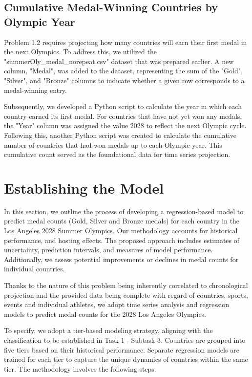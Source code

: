 \documentclass{mcmthesis}
\begin{document}
\subsection{Cumulative Medal-Winning Countries by Olympic Year}
Problem 1.2 requires projecting how many countries will earn their first medal in the next Olympics. To address this, we utilized the "summerOly\_medal\_norepeat.csv" dataset that was prepared earlier. A new column, "Medal", was added to the dataset, representing the sum of the "Gold", "Silver", and "Bronze" columns to indicate whether a given row corresponds to a medal-winning entry.

Subsequently, we developed a Python script to calculate the year in which each country earned its first medal. For countries that have not yet won any medals, the "Year" column was assigned the value 2028 to reflect the next Olympic cycle. Following this, another Python script was created to calculate the cumulative number of countries that had won medals up to each Olympic year. This cumulative count served as the foundational data for time series projection.

\section{Establishing the Model}

In this section, we outline the process of developing a regression-based model to predict medal counts (Gold, Silver and Bronze medals) for each country in the Los Angeles 2028 Summer Olympics. Our methodology accounts for historical performance, and hosting effects. The proposed approach includes estimates of uncertainty, prediction intervals, and measures of model performance. Additionally, we assess potential improvements or declines in medal counts for individual countries.

Thanks to the nature of this problem being inherently correlated to chronological projection and the provided data being complete with regard of countries, sports, events and individual athletes, we adopt time series analysis and regression models to predict medal counts for the 2028 Los Angeles Olympics.

To specify, we adopt a tier-based modeling strategy, aligning with the classification to be established in Task 1 - Subtask 3. Countries are grouped into five tiers based on their historical performance. Separate regression models are trained for each tier to capture the unique dynamics of countries within the same tier. The methodology involves the following steps:
\end{document}
